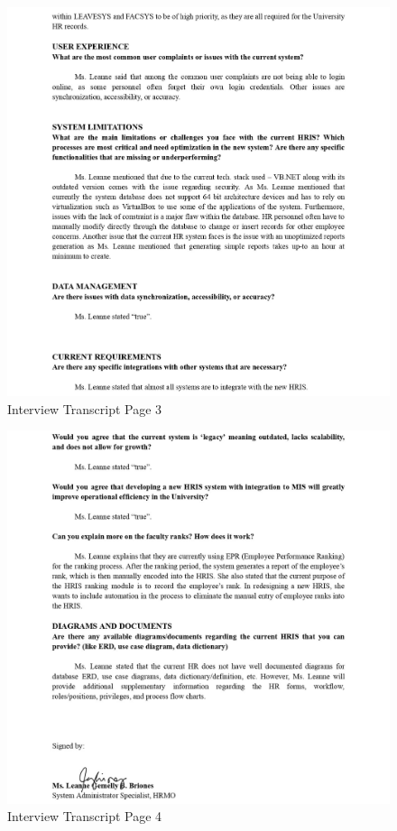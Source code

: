 \begin{figure}[H]
    \centering
    \includegraphics[width=1\linewidth]{figures/misc/minutes/interview-transcript-0003.jpg}
    \caption{Interview Transcript Page 3}
    \label{fig:interview-transcript-0003}
\end{figure}

\begin{figure}[H]
    \centering
    \includegraphics[width=1\linewidth]{figures/misc/minutes/interview-transcript-0004.jpg}
    \caption{Interview Transcript Page 4}
    \label{fig:interview-transcript-0004}
\end{figure}